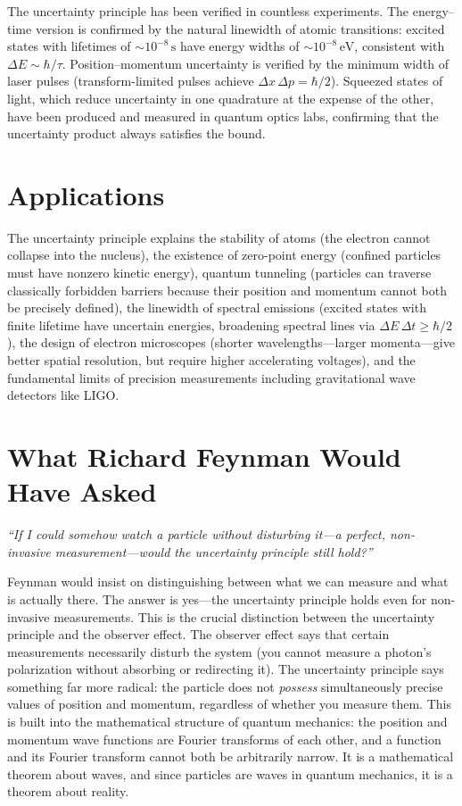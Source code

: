 \documentclass[11pt,openright]{book}
\begin{document}
The uncertainty principle has been verified in countless experiments. The energy--time version is confirmed by the natural linewidth of atomic transitions: excited states with lifetimes of $\sim 10^{-8}\,\text{s}$ have energy widths of $\sim 10^{-8}\,\text{eV}$, consistent with $\Delta E \sim \hbar/\tau$. Position--momentum uncertainty is verified by the minimum width of laser pulses (transform-limited pulses achieve $\Delta x\,\Delta p = \hbar/2$). Squeezed states of light, which reduce uncertainty in one quadrature at the expense of the other, have been produced and measured in quantum optics labs, confirming that the uncertainty product always satisfies the bound.
\section*{Applications}

The uncertainty principle explains the stability of atoms (the electron cannot collapse into the nucleus), the existence of zero-point energy (confined particles must have nonzero kinetic energy), quantum tunneling (particles can traverse classically forbidden barriers because their position and momentum cannot both be precisely defined), the linewidth of spectral emissions (excited states with finite lifetime have uncertain energies, broadening spectral lines via $\Delta E\,\Delta t \geq \hbar/2$), the design of electron microscopes (shorter wavelengths---larger momenta---give better spatial resolution, but require higher accelerating voltages), and the fundamental limits of precision measurements including gravitational wave detectors like LIGO.
\section*{What Richard Feynman Would Have Asked}

\textit{``If I could somehow watch a particle without disturbing it---a perfect, non-invasive measurement---would the uncertainty principle still hold?''}

Feynman would insist on distinguishing between what we can measure and what is actually there. The answer is yes---the uncertainty principle holds even for non-invasive measurements. This is the crucial distinction between the uncertainty principle and the observer effect. The observer effect says that certain measurements necessarily disturb the system (you cannot measure a photon's polarization without absorbing or redirecting it). The uncertainty principle says something far more radical: the particle does not \emph{possess} simultaneously precise values of position and momentum, regardless of whether you measure them. This is built into the mathematical structure of quantum mechanics: the position and momentum wave functions are Fourier transforms of each other, and a function and its Fourier transform cannot both be arbitrarily narrow. It is a mathematical theorem about waves, and since particles are waves in quantum mechanics, it is a theorem about reality.
\end{document}
